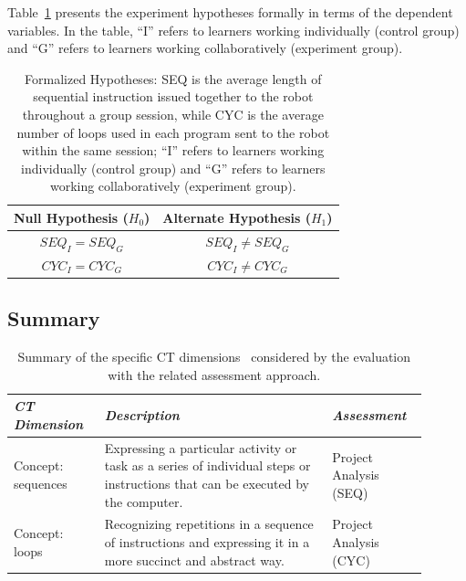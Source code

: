 Table~\ref{tab:hypotheses} presents the experiment hypotheses formally in terms of the dependent variables. In the table, ``I'' refers to learners working individually (control group) and ``G'' refers to learners working collaboratively (experiment group).

\begin{table}[ht!]
  \caption{Formalized Hypotheses: SEQ is the average length of sequential instruction issued together to the robot throughout a group session, while CYC is the average number of loops used in each program sent to the robot within the same session; ``I'' refers to learners working individually (control group) and ``G'' refers to learners working collaboratively (experiment group).}\label{tab:hypotheses}
  \centering
  \begin{tabular}{cc}
    \toprule
    Null Hypothesis (\(H_0\)) & Alternate Hypothesis (\(H_1\)) \\
    \midrule
    \(SEQ_{I} = SEQ_{G}\) & \(SEQ_{I} \neq SEQ_{G}\) \\
    \(CYC_{I} = CYC_{G}\) & \(CYC_{I} \neq CYC_{G}\) \\
    \bottomrule
  \end{tabular}
\end{table}

\subsection{Summary}

\begin{table}[ht!]
  \caption{Summary of the specific \ac{CT} dimensions~\cite{Brennan:2012} considered by the evaluation with the related assessment approach.}\label{tab:ch3summary}
  \centering
  \begin{tabular}{M{0.2\linewidth}m{0.5\linewidth}M{0.2\linewidth}}
    \toprule
    \textit{\ac{CT} Dimension} & \textit{Description} & \textit{Assessment} \\
    \midrule
    Concept: sequences & Ex\-press\-ing a par\-tic\-u\-lar ac\-tiv\-i\-ty or task as a se\-ries of in\-di\-vid\-u\-al steps or in\-struc\-tions that can be ex\-e\-cut\-ed by the com\-put\-er. & Project Analysis (SEQ) \\
    Concept: loops & Rec\-og\-niz\-ing rep\-e\-ti\-tions in a se\-quence of in\-struc\-tions and ex\-press\-ing it in a more suc\-cinct and ab\-stract way. & Project Analysis (CYC) \\
    \bottomrule
  \end{tabular}
\end{table}

